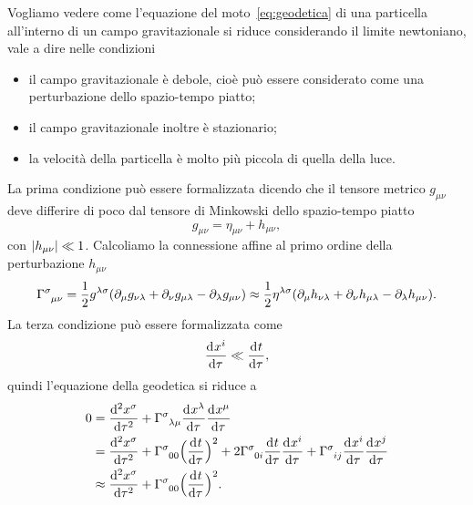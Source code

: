 Vogliamo vedere come l'equazione del moto~\eqref{eq:geodetica} di una particella
all'interno di un campo gravitazionale si riduce considerando il limite
newtoniano, vale a dire nelle condizioni
\begin{itemize}
\item il campo gravitazionale è debole, cioè può essere considerato come una
  perturbazione dello spazio-tempo piatto;
\item il campo gravitazionale inoltre è stazionario;
\item la velocità della particella è molto più piccola di quella della luce.
\end{itemize}
La prima condizione può essere formalizzata dicendo che il tensore metrico
$g_{\mu\nu}$ deve differire di poco dal tensore di Minkowski dello spazio-tempo
piatto
\begin{equation}
  g_{\mu\nu} = \eta_{\mu\nu} + h_{\mu\nu},
\end{equation}
con $\lvert h_{\mu\nu}\rvert \ll 1$.  Calcoliamo la connessione affine al primo ordine
della perturbazione $h_{\mu\nu}$
\begin{equation}
  \label{eq:christoffel-approx}
  \tensor{\Gamma}{^{\sigma}_{\mu\nu}} = \frac{1}{2}g^{\lambda\sigma}
  (\partial_{\mu}g_{\nu\lambda} + \partial_{\nu}g_{\mu\lambda}
  - \partial_{\lambda}g_{\mu\nu}) \approx \frac{1}{2}\eta^{\lambda\sigma}
  (\partial_{\mu}h_{\nu\lambda} + \partial_{\nu}h_{\mu\lambda}
  - \partial_{\lambda}h_{\mu\nu}).
\end{equation}
La terza condizione può essere formalizzata come
\begin{equation}
  \frac{{\mathop{}\!\mathrm{d}^{}}x^{i}}{\mathop{}\!\mathrm{d} {\tau}^{}} \ll \frac{{\mathop{}\!\mathrm{d}^{}}t}{\mathop{}\!\mathrm{d} {\tau}^{}},
\end{equation}
quindi l'equazione della geodetica si riduce a
\begin{equation}
  \label{eq:geodetica-approx}
  \begin{split}
    0 &= \toder[2]{x^{\sigma}}{\tau} + \tensor{\Gamma}{^{\sigma}_{\lambda\mu}}
    \toder{x^{\lambda}}{\tau} \toder{x^{\mu}}{\tau} \\
    &= \toder[2]{x^{\sigma}}{\tau} + \tensor{\Gamma}{^{\sigma}_{00}} \Big(
    \toder{t}{\tau} \Big)^{2} + 2\tensor{\Gamma}{^{\sigma}_{0i}} \toder{t}{\tau}
    \toder{x^{i}}{\tau} + \tensor{\Gamma}{^{\sigma}_{ij}} \toder{x^{i}}{\tau}
    \toder{x^{j}}{\tau} \\
    &\approx \toder[2]{x^{\sigma}}{\tau} + \tensor{\Gamma}{^{\sigma}_{00}} \Big(
    \toder{t}{\tau} \Big)^{2}.
  \end{split}
\end{equation}
